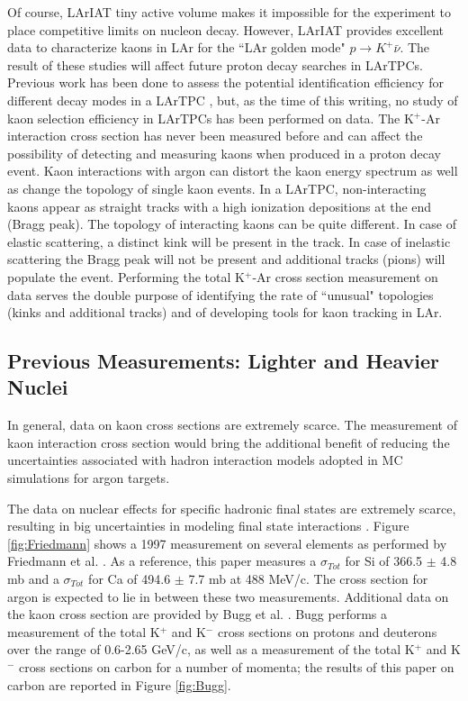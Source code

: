 Of course, LArIAT tiny active volume makes it impossible for the experiment to place competitive limits on nucleon decay.  
However,  LArIAT provides excellent data to characterize kaons in LAr for the ``LAr golden mode" $p \rightarrow K^+ \bar{\nu}$. The result of these studies will affect future proton decay searches in LArTPCs. Previous work has been done to assess the potential identification efficiency for different decay modes in a LArTPC \cite{Bueno2007}, but, as the time of this  writing, no study of kaon selection efficiency in LArTPCs has been performed on data. 
The K$^+$-Ar interaction cross section has never been measured before and can affect the possibility of detecting and measuring kaons when produced in a proton decay event. 
Kaon interactions with argon can distort the kaon energy spectrum as well as change the topology of single kaon events. In a LArTPC, non-interacting kaons appear as straight tracks with a high ionization depositions at the end (Bragg peak). The topology of interacting kaons can be quite different. In case of elastic scattering, a distinct kink will be present in the track. In case of inelastic scattering the Bragg peak will not be present and additional tracks (pions) will populate the event.
Performing the total K$^+$-Ar cross section measurement on data serves the double purpose of identifying the rate of ``unusual" topologies (kinks and additional tracks) and of developing tools for kaon tracking in LAr.


\subsection{Previous Measurements: Lighter and Heavier Nuclei}
In general, data on kaon cross sections are  extremely scarce. The measurement of kaon interaction cross section would bring the additional benefit of reducing the uncertainties associated  with hadron interaction models adopted in MC simulations for argon targets.

The data on nuclear effects for specific hadronic final states are extremely scarce, resulting in big uncertainties in modeling final state interactions \cite{Drakoulakos:2004gn}. Figure \ref{fig:Friedmann} shows a 1997 measurement on several elements as performed by  Friedmann et al.  \cite{Friedman:1997eq}. As a reference, this paper measures a $\sigma_{Tot}$ for Si of  366.5  $\pm$  4.8 mb and a $\sigma_{Tot}$ for Ca of 494.6  $\pm$ 7.7 mb at 488 MeV/c.  The cross section for argon is expected to lie in between these two measurements. 
Additional data on the kaon cross section are provided by Bugg et al. \cite{PhysRev.168.1466}. Bugg performs a measurement of the total 
K$^+$ and K$^-$ cross sections on protons and deuterons over the range of 0.6-2.65 GeV/c, as well as a measurement of the total K$^+$ and K$^-$  cross sections on carbon for a number of momenta; the results of this paper on carbon are reported in Figure \ref{fig:Bugg}.




